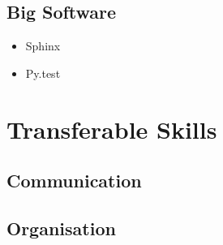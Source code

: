 \documentclass[a4paper,11pt]{article} %
\begin{document}
\subsection{Big Software}
\label{sec:technical.bigsoftware}

\begin{itemize}
\item Sphinx
\item Py.test
\end{itemize}

\section{Transferable Skills}
\label{sec:transferable}

\subsection{Communication}
\label{sec:transferable.communication}

\subsection{Organisation}
\label{sec:transferable.organisation}
\end{document}
